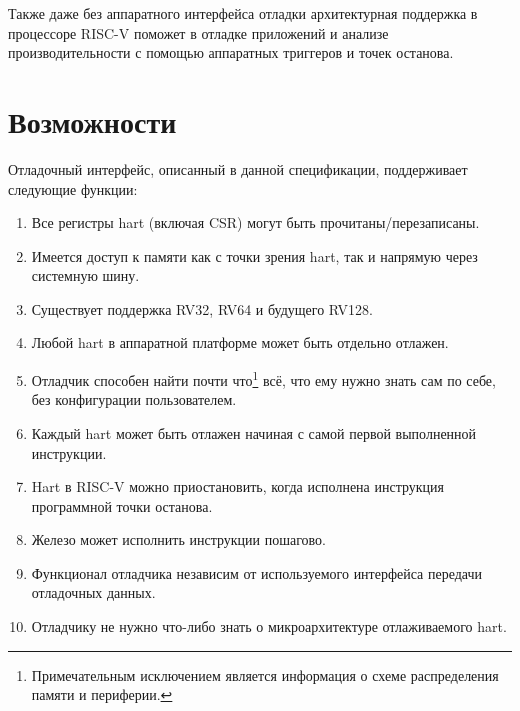 Также даже без аппаратного интерфейса отладки архитектурная
поддержка в процессоре RISC-V поможет в отладке приложений и анализе
производительности с помощью аппаратных триггеров и точек останова.

\section{Возможности}

Отладочный интерфейс, описанный в данной спецификации, поддерживает следующие функции:

\begin{enumerate}
   \item Все регистры hart (включая CSR) могут быть прочитаны/перезаписаны.
   \item Имеется доступ к памяти как с точки зрения hart, так и напрямую через
       системную шину.
   \item Существует поддержка RV32, RV64 и будущего RV128.
   \item Любой hart в аппаратной платформе может быть отдельно отлажен.
   \item Отладчик способен найти почти что\footnote{Примечательным исключением
       является информация о схеме распределения памяти и периферии.} всё, что ему
       нужно знать сам по себе, без конфигурации пользователем.
   \item Каждый hart может быть отлажен начиная с самой первой выполненной инструкции.
   \item Hart в RISC-V можно приостановить, когда исполнена инструкция программной
       точки останова.
   \item Железо может исполнить инструкции пошагово.
   \item Функционал отладчика независим от используемого интерфейса передачи отладочных данных.
   \item Отладчику не нужно что-либо знать о микроархитектуре отлаживаемого hart.


\end{enumerate}
